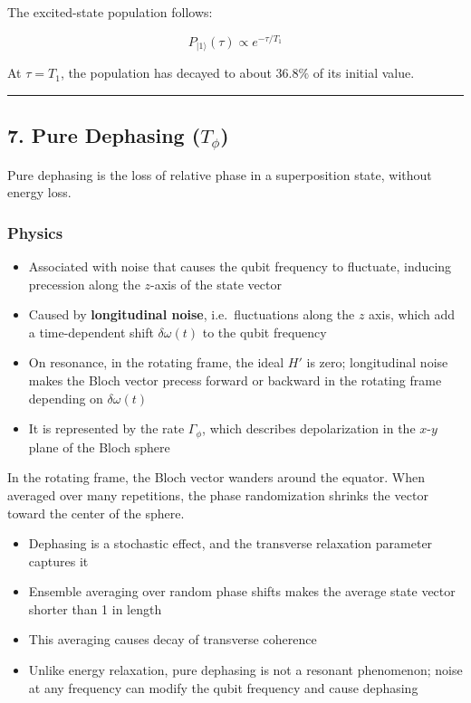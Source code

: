 \documentclass[
]{article}
\providecommand{\tightlist}{%
  \setlength{\itemsep}{0pt}\setlength{\parskip}{0pt}}
\begin{document}
The excited-state population follows:

\[
P_{|1\rangle}(\tau) \propto e^{-\tau/T_1}
\]

At \(\tau = T_1\), the population has decayed to about \(36.8\%\) of its
initial value.

\begin{center}\rule{0.5\linewidth}{0.5pt}\end{center}

\subsection{\texorpdfstring{7. Pure Dephasing
(\(T_\phi\))}{7. Pure Dephasing (T\_\textbackslash phi)}}\label{pure-dephasing-t_phi}

Pure dephasing is the loss of relative phase in a superposition state,
without energy loss.

\subsubsection{Physics}\label{physics-1}

\begin{itemize}
\tightlist
\item
  Associated with noise that causes the qubit frequency to fluctuate,
  inducing precession along the \(z\)-axis of the state vector
\item
  Caused by \textbf{longitudinal noise}, i.e.~fluctuations along the
  \(z\) axis, which add a time-dependent shift \(\delta\omega(t)\) to
  the qubit frequency
\item
  On resonance, in the rotating frame, the ideal \(H'\) is zero;
  longitudinal noise makes the Bloch vector precess forward or backward
  in the rotating frame depending on \(\delta\omega(t)\)
\item
  It is represented by the rate \(\Gamma_\phi\), which describes
  depolarization in the \(x\)-\(y\) plane of the Bloch sphere
\end{itemize}

In the rotating frame, the Bloch vector wanders around the equator. When
averaged over many repetitions, the phase randomization shrinks the
vector toward the center of the sphere.

\begin{itemize}
\tightlist
\item
  Dephasing is a stochastic effect, and the transverse relaxation
  parameter captures it
\item
  Ensemble averaging over random phase shifts makes the average state
  vector shorter than 1 in length
\item
  This averaging causes decay of transverse coherence
\item
  Unlike energy relaxation, pure dephasing is not a resonant phenomenon;
  noise at any frequency can modify the qubit frequency and cause
  dephasing
\end{itemize}
\end{document}
